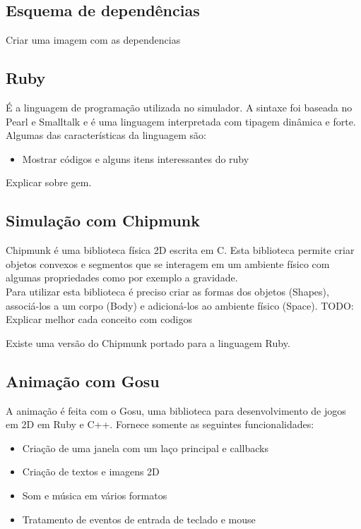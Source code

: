 \subsection{Esquema de dependências}
Criar uma imagem com as dependencias


\subsection{Ruby}
É a linguagem de programação utilizada no simulador. A sintaxe foi baseada no Pearl e Smalltalk e é uma linguagem interpretada com tipagem dinâmica e forte.
Algumas das características da linguagem são:
\begin{itemize}
  \item Mostrar códigos e alguns itens interessantes do ruby
\end{itemize}

Explicar sobre gem.

\subsection{Simulação com Chipmunk}
Chipmunk é uma biblioteca física 2D escrita em C. Esta biblioteca permite criar objetos convexos e segmentos que se interagem em um ambiente físico com algumas propriedades 
como por exemplo a gravidade. \\

Para utilizar esta biblioteca é preciso criar as formas dos objetos (Shapes), associá-los a um corpo (Body) e adicioná-los ao ambiente físico (Space).
TODO: Explicar melhor cada conceito com codigos

Existe uma versão do Chipmunk portado para a linguagem Ruby.

\subsection{Animação com Gosu}
A animação é feita com o Gosu, uma biblioteca para desenvolvimento de jogos em 2D em Ruby e C++. Fornece somente as seguintes funcionalidades:

\begin{itemize}
  \item Criação de uma janela com um laço principal e callbacks
  \item Criação de textos e imagens 2D
  \item Som e música em vários formatos
  \item Tratamento de eventos de entrada de teclado e mouse
\end{itemize}

